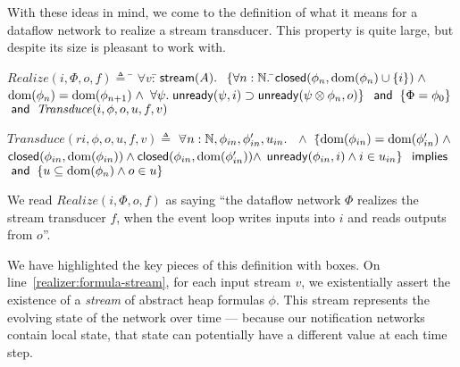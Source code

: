 \documentclass[natbib]{sigplanconf}
\begin{document}
With these ideas in mind, we come to the definition of what it means
for a dataflow network to realize a stream transducer. This property
is quite large, but despite its size is pleasant to work with.
{\small
\begin{specification}
\nextline
$Realize(i, \Phi, o, f) \triangleq$ 
\;\= $\forall v:$\=$\,\mbox{\textsf{{stream}}}({A}).\;$  
\>\> $\{\forall n:\mathbb{N}.\;$\=$\mbox{\textsf{{closed}}}({\phi_n}, {\mbox{dom}({\phi_n}) \cup \{{i}\}}) \;\land$ \nextline
\>\>\>$\mbox{dom}({\phi_n}) = \mbox{dom}({\phi_{n+1}})\; \land$ 
\>\>\>$\forall \psi.\; \mbox{\textsf{{unready}}}({\psi}, {i}) \supset \mbox{\textsf{{unready}}}({\psi \otimes \phi_n}, {o})\}$ 
\>\> $\;\mbox{\textsf{{and}}}\; \; \{\Phi = \phi_0\}$ 
\>\> $\;\mbox{\textsf{{and}}}\; \;  \mathit{Transduce}(i, \phi, o, u, f, v)$ 


$\mathit{Transduce}(ri, \phi, o, u, f, v) \triangleq$ 
\> $\forall $\=$ n:\mathbb{N}, \phi_{in}, \phi'_{in}, u_{in}.$ \nextline
\>\>  $\; \land$ \nextline
\>\> $\{$\=$\mbox{dom}({\phi_{in}}) = \mbox{dom}({\phi'_{in}}) \;\land $ \nextline
\>\>     \>$\mbox{\textsf{{closed}}}({\phi_{in}}, {\mbox{dom}({\phi_{in}})}) \land 
            \mbox{\textsf{{closed}}}({\phi_{in}}, {\mbox{dom}({\phi'_{in}})}) \land $ \nextline
\>\>     \>$\mbox{\textsf{{unready}}}({\phi_{in}}, {i}) \land
            i \in u_{in}\}$ \nextline
\>\> \!\!\!\!$\mbox{\textsf{{ implies }}}$ \nextline
\>\>  \nextline
\>\> $\;\mbox{\textsf{{and}}}\;\; \{u \subseteq \mbox{dom}({\phi_n}) \land o \in u\}$ \nextline
\end{specification}
}

We read $Realize(i, \Phi, o, f)$ as saying ``the dataflow network
$\Phi$ realizes the stream transducer $f$, when the event loop writes
inputs into $i$ and reads outputs from $o$''. 

We have highlighted the key pieces of this definition with boxes. On
line~\ref{realizer:formula-stream}, for each input stream $v$, we
existentially assert the existence of a \emph{stream} of abstract heap
formulas $\phi$. This stream represents the evolving state of the
network over time --- because our notification networks contain local
state, that state can potentially have a different value at each time
step.
\end{document}
